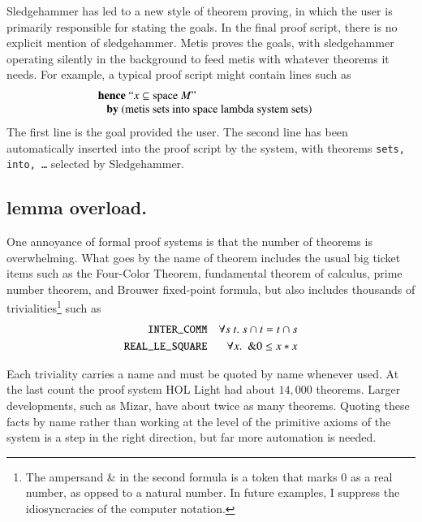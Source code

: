 \documentclass{llncs}
\begin{document}

Sledgehammer has led to a new style of theorem proving, in which the
user is primarily responsible for stating the goals.  In the final
proof script, there is no explicit mention of sledgehammer.  Metis
proves the goals, with sledgehammer operating silently in the
background to feed metis with whatever theorems it needs.
For example, a typical proof script might contain  lines such as \cite{Paar}
\[
\begin{array}{ll}
\text{{\bf hence} ``$x \subseteq \text{space}~M$''}\\
\text{~~~{\bf by} (metis sets into space lambda system sets)}&
\end{array}
\]
The first line is the goal provided the user. The second line has been
automatically inserted into the proof script by the system, with
theorems {\tt sets, into, \dots} selected by Sledgehammer.






\subsection{lemma overload.}

One annoyance of formal proof systems is that the number of theorems
is overwhelming.  What goes by the name of theorem includes
the usual big ticket items such as the Four-Color Theorem, 
fundamental theorem of calculus, prime number
theorem, and Brouwer fixed-point formula, but also includes thousands
of trivialities\footnote{The ampersand \& in the second formula is a token
that marks $0$ as a real number, as oppsed to a natural number. In future
examples, I suppress the idiosyncracies of the computer notation.} such as
\begin{align*}
\text{\tt INTER\_COMM} & &\forall s\ t.\ s \cap t = t \cap s\\
\text{\tt REAL\_LE\_SQUARE} & &\forall x.\ \ \text{\&}0 \le x * x
\end{align*}

Each triviality carries a name and must be quoted by name whenever
used.  At the last count the proof system HOL Light had about $14,000$
theorems.  Larger developments, such as Mizar, have about twice as
many theorems.  Quoting these facts by name rather than working at the
level of the primitive axioms of the system is a step in the right
direction, but far more automation is needed.
\end{document}
